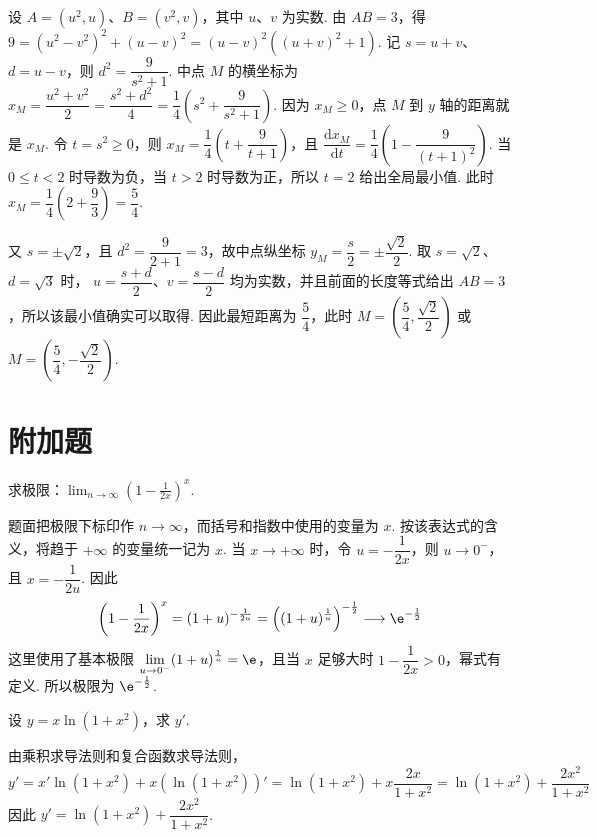 \documentclass[UTF8,a4paper,oneside,11pt]{ctexbook}
\begin{document}
\begin{solution}
设 \(A=(u^2,u)\)、\(B=(v^2,v)\)，其中 \(u\)、\(v\) 为实数. 由 \(AB=3\)，得
\(9=(u^2-v^2)^2+(u-v)^2=(u-v)^2\left((u+v)^2+1\right)\). 记 \(s=u+v\)、\(d=u-v\)，则 \(d^2=\dfrac{9}{s^2+1}\). 中点 \(M\) 的横坐标为 \(x_M=\dfrac{u^2+v^2}{2}=\dfrac{s^2+d^2}{4}=\dfrac14\left(s^2+\dfrac{9}{s^2+1}\right)\).
因为 \(x_M\geqslant0\)，点 \(M\) 到 \(y\) 轴的距离就是 \(x_M\). 令 \(t=s^2\geqslant0\)，则
\(x_M=\dfrac14\left(t+\dfrac{9}{t+1}\right)\)，且
\(\dfrac{\mathrm d x_M}{\mathrm dt}=\dfrac14\left(1-\dfrac{9}{(t+1)^2}\right)\).
当 \(0\leqslant t<2\) 时导数为负，当 \(t>2\) 时导数为正，所以 \(t=2\) 给出全局最小值. 此时
\(x_M=\dfrac14\left(2+\dfrac93\right)=\dfrac54\).

又 \(s=\pm\sqrt2\)，且 \(d^2=\dfrac9{2+1}=3\)，故中点纵坐标
\(y_M=\dfrac{s}{2}=\pm\dfrac{\sqrt2}{2}\). 取 \(s=\sqrt2\)、\(d=\sqrt3\) 时，
\(u=\dfrac{s+d}{2}\)、\(v=\dfrac{s-d}{2}\) 均为实数，并且前面的长度等式给出 \(AB=3\)，所以该最小值确实可以取得. 因此最短距离为 \(\dfrac54\)，此时
\(M=\left(\dfrac54,\dfrac{\sqrt2}{2}\right)\) 或 \(M=\left(\dfrac54,-\dfrac{\sqrt2}{2}\right)\).
\end{solution}


\section{附加题}

\begin{problem}

求极限：\(\displaystyle\lim_{n\to\infty}\left(1 - \frac{1}{2x}\right)^x\).
\end{problem}

\begin{solution}
题面把极限下标印作 \(n\to\infty\)，而括号和指数中使用的变量为 \(x\). 按该表达式的含义，将趋于 \(+\infty\) 的变量统一记为 \(x\). 当 \(x\to+\infty\) 时，令 \(u=-\dfrac{1}{2x}\)，则 \(u\to0^-\)，且 \(x=-\dfrac{1}{2u}\). 因此
\[
\left(1-\frac{1}{2x}\right)^x
=(1+u)^{-\frac{1}{2u}}
=\left((1+u)^{\frac1u}\right)^{-\frac12}
\longrightarrow\e^{-\frac12}
\]
这里使用了基本极限 \(\displaystyle\lim_{u\to0^-}(1+u)^{\frac{1}{u}}=\e\)，且当 \(x\) 足够大时 \(1-\dfrac1{2x}>0\)，幂式有定义. 所以极限为 \(\e^{-\frac12}\).
\end{solution}

\begin{problem}

设 \(y = x\ln\left(1 + x^2\right)\)，求 \(y'\).
\end{problem}

\begin{solution}
由乘积求导法则和复合函数求导法则，
\[
y'=x'\ln\left(1+x^2\right)+x\left(\ln\left(1+x^2\right)\right)'
=\ln\left(1+x^2\right)+x\frac{2x}{1+x^2}
=\ln\left(1+x^2\right)+\frac{2x^2}{1+x^2}
\]
因此 \(y'=\ln\left(1+x^2\right)+\dfrac{2x^2}{1+x^2}\).
\end{solution}

\end{document}

